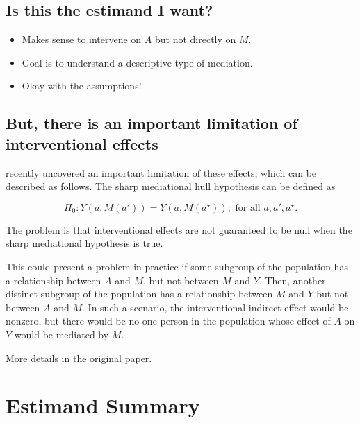 \documentclass[
  12pt,
]{book}
\providecommand{\tightlist}{%
  \setlength{\itemsep}{0pt}\setlength{\parskip}{0pt}}
\theoremstyle{definition}
\theoremstyle{definition}
\theoremstyle{definition}
\newcommand{\1}{\mathbbm{1}}
\begin{document}
\hypertarget{is-this-the-estimand-i-want-2}{%
\subsection{Is this the estimand I want?}\label{is-this-the-estimand-i-want-2}}

\begin{itemize}
\tightlist
\item
  Makes sense to intervene on \(A\) but not directly on \(M\).
\item
  Goal is to understand a descriptive type of mediation.
\item
  Okay with the assumptions!
\end{itemize}

\hypertarget{but-there-is-an-important-limitation-of-interventional-effects}{%
\subsection{But, there is an important limitation of interventional effects}\label{but-there-is-an-important-limitation-of-interventional-effects}}

\citet{miles2022causal} recently uncovered an important limitation of these effects,
which can be described as follows. The sharp mediational hull hypothesis can be
defined as

\[H_0:Y(a, M(a')) = Y(a, M(a^\star));\text{ for all }a, a', a^\star.\]

The problem is that interventional effects are not guaranteed to be null when
the sharp mediational hypothesis is true.

This could present a problem in practice if some subgroup of the population has
a relationship between \(A\) and \(M\), but not between \(M\) and \(Y\). Then, another
distinct subgroup of the population has a relationship between \(M\) and \(Y\) but
not between \(A\) and \(M\). In such a scenario, the interventional indirect effect
would be nonzero, but there would be no one person in the population whose
effect of \(A\) on \(Y\) would be mediated by \(M\).

More details in the original paper.

\hypertarget{estimand-summary}{%
\section{Estimand Summary}\label{estimand-summary}}
\end{document}
